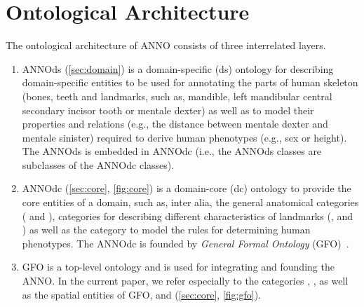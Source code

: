 \documentclass[sw]{iosart2x}
\newcommand{\aw}{AnthroWorks3D}
\begin{document}


\section{Ontological Architecture}\label{sec:architecture}

The ontological architecture of ANNO consists of three interrelated layers.

\begin{enumerate}
  
  \item ANNOds (\cref{sec:domain}) is a domain-specific (ds) ontology for describing domain-specific entities to be used for annotating 
the parts of human skeleton (bones, teeth and landmarks, such as, mandible, left mandibular central secondary incisor tooth 
or mentale dexter) as well as to model their properties and relations (e.g., the distance between mentale dexter and mentale sinister) 
required to derive human phenotypes (e.g., sex or height). The ANNOds is embedded in ANNOdc 
(i.e., the ANNOds classes are subclasses of the ANNOdc classes).
  
  \item ANNOdc (\cref{sec:core}, \cref{fig:core}) is a domain-core (dc) ontology to provide the core entities of a domain, such as, inter alia, 
the general anatomical categories ( and ), categories for describing different characteristics of 
landmarks (,  and ) as well as 
the category  to model the rules for determining human phenotypes. The ANNOdc is founded by \emph{General Formal Ontology} (GFO)~\citep{gfo}.
  
  \item GFO is a top-level ontology and is used for integrating and founding the ANNO. In the current paper, we refer especially to the categories 
, ,  as well as the spatial entities of GFO,  and  (\cref{sec:core}, \cref{fig:gfo}).
\end{enumerate}
\end{document}
